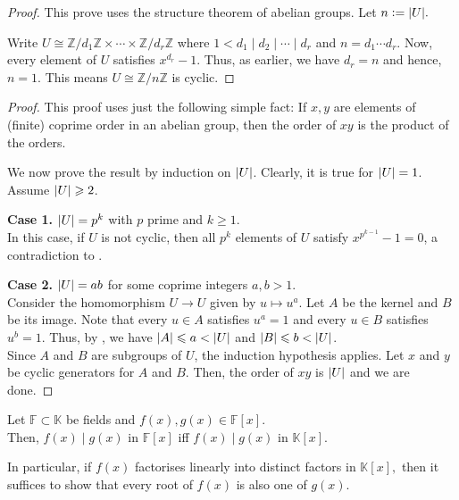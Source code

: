 \begin{proof} 
    This prove uses the structure theorem of abelian groups. Let $n \vcentcolon= {\left\lvert U \right\lvert}.$

    Write $U \cong \mathbb{Z}/d_1\mathbb{Z} \times \cdots \times \mathbb{Z}/d_r\mathbb{Z}$ where $1 < d_1 \mid d_2 \mid \cdots \mid d_r$ and $n = d_1 \cdots d_r.$ Now, every element of $U$ satisfies $x^{d_r} - 1.$ Thus, as earlier, we have $d_r = n$ and hence, $n = 1.$ This means $U \cong \mathbb{Z}/n\mathbb{Z}$ is cyclic. 
\end{proof}
\begin{proof} 
    This proof uses just the following simple fact: If $x, y$ are elements of (finite) coprime order in an abelian group, then the order of $xy$ is the product of the orders.

    We now prove the result by induction on ${\left\lvert U \right\lvert}$. Clearly, it is true for ${\left\lvert U \right\lvert} = 1$. Assume ${\left\lvert U \right\lvert} \geqslant 2$.

    \textbf{Case 1.} ${\left\lvert U \right\lvert} = p^{k}$ with $p$ prime and $k \ge 1$. \\
    In this case, if $U$ is not cyclic, then all $p^{k}$ elements of $U$ satisfy $x^{p^{k - 1}} - 1 = 0$, a contradiction to .

    \textbf{Case 2.} ${\left\lvert U \right\lvert} = ab$ for some coprime integers $a, b > 1$. \\
    Consider the homomorphism $U \to U$ given by $u \mapsto u^{a}$. Let $A$ be the kernel and $B$ be its image. Note that every $u \in A$ satisfies $u^{a} = 1$ and every $u \in B$ satisfies $u^{b} = 1$. Thus, by , we have ${\left\lvert A \right\lvert} \leqslant a < {\left\lvert U \right\lvert}$ and ${\left\lvert B \right\lvert} \leqslant b < {\left\lvert U \right\lvert}$. \\
    Since $A$ and $B$ are subgroups of $U$, the induction hypothesis applies. Let $x$ and $y$ be cyclic generators for $A$ and $B$. Then, the order of $xy$ is ${\left\lvert U \right\lvert}$ and we are done.
\end{proof}

\begin{prop} \label{prop:divisibilityofpoly}
    Let $\mathbb{F} \subset \mathbb{K}$ be fields and $f(x), g(x) \in \mathbb{F}[x].$ \\
    Then, $f(x) \mid g(x)$ in $\mathbb{F}[x]$ iff $f(x) \mid g(x)$ in $\mathbb{K}[x].$

    In particular, if $f(x)$ factorises linearly into distinct factors in $\mathbb{K}[x],$ then it suffices to show that every root of $f(x)$ is also one of $g(x).$
\end{prop}

